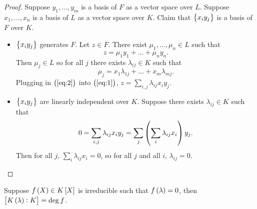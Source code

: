 \begin{proof}
Suppose $ y_1, \dots, y_m $ is a basis of $ F $ as a vector space over $ L $. Suppose $ x_1, \dots, x_n $ is a basis of $ L $ as a vector space over $ K $. Claim that $ \cbr{x_iy_j} $ is a basis of $ F $ over $ K $.
\begin{itemize}
\item $ \cbr{x_iy_j} $ generates $ F $. Let $ z \in F $. There exist $ \mu_1, \dots, \mu_n \in L $ such that
\begin{equation}
\label{eq:1}
z = \mu_1y_1 + \dots + \mu_ny_n.
\end{equation}
Then $ \mu_j \in L $ so for all $ j $ there exists $ \lambda_{ij} \in K $ such that
\begin{equation}
\label{eq:2}
\mu_j = x_1\lambda_{1j} + \dots + x_m\lambda_{mj}.
\end{equation}
Plugging in $ \br{\ref{eq:2}} $ into $ \br{\ref{eq:1}} $, $ z = \sum_{i, j} \lambda_{ij}x_iy_j $.
\item $ \cbr{x_iy_j} $ are linearly independent over $ K $. Suppose there exists $ \lambda_{ij} \in K $ such that
$$ 0 = \sum_{i, j} \lambda_{ij}x_iy_j = \sum_j \br{\sum_i \lambda_{ij}x_i}y_j. $$
Then for all $ j $, $ \sum_i \lambda_{ij}x_i = 0 $, so for all $ j $ and all $ i $, $ \lambda_{ij} = 0 $.
\end{itemize}
\end{proof}

\pagebreak

\begin{theorem}
\label{thm:degree}
Suppose $ f\br{X} \in K\sbr{X} $ is irreducible such that $ f\br{\lambda} = 0 $, then $ \sbr{K\br{\lambda} : K} = \deg f $.
\end{theorem}

